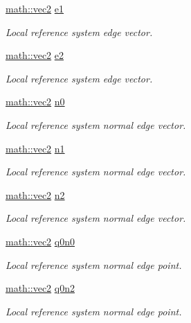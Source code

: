 \begin{DoxyCompactItemize}
\hyperlink{structphysim_1_1math_1_1vec2}{math\+::vec2} \hyperlink{classphysim_1_1geometry_1_1triangle_a1c94f05234361db97e282aaee2bda8f9}{e1}
\begin{DoxyCompactList}\small\item\em Local reference system edge vector. \end{DoxyCompactList}\item 
\hyperlink{structphysim_1_1math_1_1vec2}{math\+::vec2} \hyperlink{classphysim_1_1geometry_1_1triangle_a560a7684adbd40a8386e46767a759574}{e2}
\begin{DoxyCompactList}\small\item\em Local reference system edge vector. \end{DoxyCompactList}\item 
\hyperlink{structphysim_1_1math_1_1vec2}{math\+::vec2} \hyperlink{classphysim_1_1geometry_1_1triangle_a0d45217eeeeee6df38e4167384a3ce29}{n0}
\begin{DoxyCompactList}\small\item\em Local reference system normal edge vector. \end{DoxyCompactList}\item 
\hyperlink{structphysim_1_1math_1_1vec2}{math\+::vec2} \hyperlink{classphysim_1_1geometry_1_1triangle_abebf947c1772ae8b3932a2c3e84597c6}{n1}
\begin{DoxyCompactList}\small\item\em Local reference system normal edge vector. \end{DoxyCompactList}\item 
\hyperlink{structphysim_1_1math_1_1vec2}{math\+::vec2} \hyperlink{classphysim_1_1geometry_1_1triangle_a18331f9216797cdb920b1dfb9d04b3d4}{n2}
\begin{DoxyCompactList}\small\item\em Local reference system normal edge vector. \end{DoxyCompactList}\item 
\hyperlink{structphysim_1_1math_1_1vec2}{math\+::vec2} \hyperlink{classphysim_1_1geometry_1_1triangle_aa5b6924651358f265c6c81a7aea1b440}{q0n0}
\begin{DoxyCompactList}\small\item\em Local reference system normal edge point. \end{DoxyCompactList}\item 
\hyperlink{structphysim_1_1math_1_1vec2}{math\+::vec2} \hyperlink{classphysim_1_1geometry_1_1triangle_a3637d2ff3e60e9f53818786e54106b88}{q0n2}
\begin{DoxyCompactList}\small\item\em Local reference system normal edge point. \end{DoxyCompactList}\item 

\end{DoxyCompactItemize}
